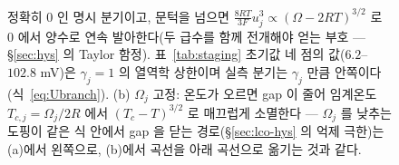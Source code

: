\begin{figure}[t]
{정확히 $0$ 인 명시 분기이고, 문턱을 넘으면 $\tfrac{8RT}{3F}u_j^3\propto(\Omega-2RT)^{3/2}$ 로 $0$
에서 양수로 연속 발아한다(두 급수를 함께 전개해야 얻는 부호 --- \S\ref{sec:hys} 의 Taylor 함정).
표~\ref{tab:staging} 초기값 네 점의 값($6.2$--$102.8$ mV)은 $\gamma_j{=}1$ 의 열역학 상한이며 실측
분기는 $\gamma_j$ 만큼 안쪽이다(식~\eqref{eq:Ubranch}). (b) $\Omega_j$ 고정: 온도가 오르면 gap 이
줄어 임계온도 $T_{c,j}=\Omega_j/2R$ 에서 $(T_c-T)^{3/2}$ 로 매끄럽게 소멸한다 --- $\Omega_j$ 를
낮추는 도핑이 같은 식 안에서 gap 을 닫는 경로(\S\ref{sec:lco-hys} 의 억제 극한)는 (a)에서 왼쪽으로,
(b)에서 곡선을 아래 곡선으로 옮기는 것과 같다.}
\label{fig:cand-ff3-5}
\end{figure}

